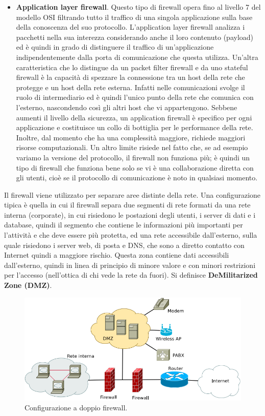 \begin{itemize}
	\item \textbf{Application layer firewall}. Questo tipo di firewall opera fino al livello 7 del modello OSI filtrando tutto il traffico di una singola applicazione sulla base della conoscenza del suo protocollo. L'application layer firewall analizza i pacchetti nella sua interezza considerando anche il loro contenuto (payload) ed è quindi in grado di distinguere il traffico di un'applicazione indipendentemente dalla porta di comunicazione che questa utilizza. Un'altra caratteristica che lo distingue da un packet filter firewall e da uno stateful firewall è la capacità di spezzare la connessione tra un host della rete che protegge e un host della rete esterna. Infatti nelle comunicazioni svolge il ruolo di intermediario ed è quindi l'unico punto della rete che comunica con l'esterno, nascondendo così gli altri host che vi appartengono. Sebbene aumenti il livello della sicurezza, un application firewall è specifico per ogni applicazione e costituisce un collo di bottiglia per le performance della rete. Inoltre, dal momento che ha una complessità maggiore, richiede maggiori risorse computazionali. Un altro limite risiede nel fatto che, se ad esempio variamo la versione del protocollo, il firewall non funziona più; è quindi un tipo di firewall che funziona bene solo se vi è una collaborazione diretta con gli utenti, cioè se il protocollo di comunicazione è noto in qualsiasi momento.
\end{itemize}
Il firewall viene utilizzato per separare aree distinte della rete. Una configurazione tipica è quella in cui il firewall separa due segmenti di rete formati da una rete interna (corporate), in cui risiedono le postazioni degli utenti, i
server di dati e i database, quindi il segmento che contiene le informazioni più importanti per l'attività e che deve essere più protetta, ed una rete accessibile dall'esterno, sulla quale risiedono i server web, di posta e DNS, che sono a diretto contatto con Internet quindi a maggiore rischio. Questa zona contiene dati accessibili dall'esterno, quindi in linea di principio di minore valore e con minori restrizioni per l’accesso (nell'ottica di chi vede la rete da fuori). Si definisce \textbf{DeMilitarized Zone (DMZ)}.\\
\begin{figure}[htbp]
	\centering
	\includegraphics[scale = 0.5]{images/double-firewall}
	\caption{Configurazione a doppio firewall.}
	\label{img:double-firewall}
\end{figure}
